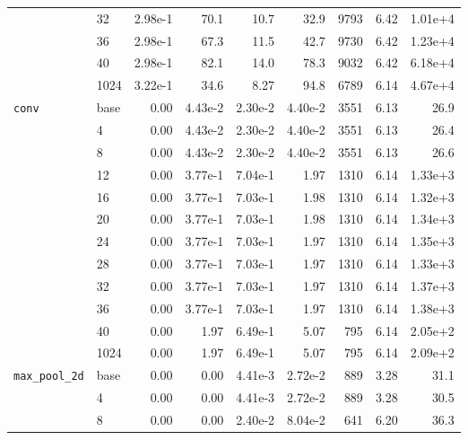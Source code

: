 \begin{longtable}{llrrrrrrr}
\cmidrule{2-9}
         & 32   &   2.98e-1 & 70.1 & 10.7 & 32.9 &    9793 &     6.42 & 1.01e+4 \\
\cmidrule{2-9}
         & 36   &   2.98e-1 & 67.3 & 11.5 & 42.7 &    9730 &     6.42 & 1.23e+4 \\
\cmidrule{2-9}
         & 40   &   2.98e-1 & 82.1 & 14.0 & 78.3 &    9032 &     6.42 & 6.18e+4 \\
\cmidrule{2-9}
         & 1024 &   3.22e-1 & 34.6 & 8.27 & 94.8 &    6789 &     6.14 & 4.67e+4 \\
\midrule
\texttt{conv} & base &   0.00 & 4.43e-2 & 2.30e-2 & 4.40e-2 &    3551 &     6.13 & 26.9 \\
\cmidrule{2-9}
         & 4    &   0.00 & 4.43e-2 & 2.30e-2 & 4.40e-2 &    3551 &     6.13 & 26.4 \\
\cmidrule{2-9}
         & 8    &   0.00 & 4.43e-2 & 2.30e-2 & 4.40e-2 &    3551 &     6.13 & 26.6 \\
\cmidrule{2-9}
         & 12   &   0.00 & 3.77e-1 & 7.04e-1 & 1.97 &    1310 &     6.14 & 1.33e+3 \\
\cmidrule{2-9}
         & 16   &   0.00 & 3.77e-1 & 7.03e-1 & 1.98 &    1310 &     6.14 & 1.32e+3 \\
\cmidrule{2-9}
         & 20   &   0.00 & 3.77e-1 & 7.03e-1 & 1.98 &    1310 &     6.14 & 1.34e+3 \\
\cmidrule{2-9}
         & 24   &   0.00 & 3.77e-1 & 7.03e-1 & 1.97 &    1310 &     6.14 & 1.35e+3 \\
\cmidrule{2-9}
         & 28   &   0.00 & 3.77e-1 & 7.03e-1 & 1.97 &    1310 &     6.14 & 1.33e+3 \\
\cmidrule{2-9}
         & 32   &   0.00 & 3.77e-1 & 7.03e-1 & 1.97 &    1310 &     6.14 & 1.37e+3 \\
\cmidrule{2-9}
         & 36   &   0.00 & 3.77e-1 & 7.03e-1 & 1.97 &    1310 &     6.14 & 1.38e+3 \\
\cmidrule{2-9}
         & 40   &   0.00 & 1.97 & 6.49e-1 & 5.07 &     795 &     6.14 & 2.05e+2 \\
\cmidrule{2-9}
         & 1024 &   0.00 & 1.97 & 6.49e-1 & 5.07 &     795 &     6.14 & 2.09e+2 \\
\midrule
\texttt{max\_pool\_2d} & base &   0.00 & 0.00 & 4.41e-3 & 2.72e-2 &     889 &     3.28 & 31.1 \\
         & 4    &   0.00 & 0.00 & 4.41e-3 & 2.72e-2 &     889 &     3.28 & 30.5 \\
\cmidrule{2-9}
         & 8    &   0.00 & 0.00 & 2.40e-2 & 8.04e-2 &     641 &     6.20 & 36.3 \\

\end{longtable}
